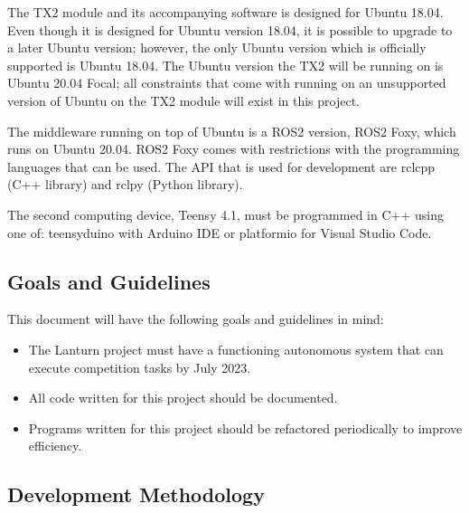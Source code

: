 The TX2 module and its accompanying software is designed for Ubuntu 18.04. Even
though it is designed for Ubuntu version 18.04, it is possible to upgrade to a
later Ubuntu version; however, the only Ubuntu version which is officially
supported is Ubuntu 18.04. The Ubuntu version the TX2 will be running on is
Ubuntu 20.04 Focal; all constraints that come with running on an unsupported
version of Ubuntu on the TX2 module will exist in this project. 
\par

The middleware running on top of Ubuntu is a ROS2 version, ROS2 Foxy, which
runs on Ubuntu 20.04. ROS2 Foxy comes with restrictions with the programming
languages that can be used. The API that is used for development are rclcpp
(C++ library) and rclpy (Python library). 
\par

The second computing device, Teensy 4.1, must be programmed in C++ using one
of: teensyduino with Arduino IDE or platformio for Visual Studio Code.
\par

\subsection{Goals and Guidelines}
\label{sec:goals}

This document will have the following goals and guidelines in mind: 

\begin{itemize}
    \item The Lanturn project must have a functioning autonomous system that
        can execute competition tasks by July 2023.
    \item All code written for this project should be documented. 
    \item Programs written for this project should be refactored periodically
        to improve efficiency.
\end{itemize}

\subsection{Development Methodology}
\label{sec:methodology}

